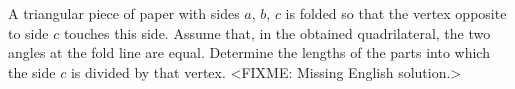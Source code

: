 \problem{}
A triangular piece of paper with sides $a$, $b$, $c$ is folded so that the
vertex opposite to side $c$ touches this side.
Assume that, in the obtained quadrilateral, the two angles at the fold line are
equal.
Determine the lengths of the parts into which the side $c$ is divided by that
vertex.
\solution
<FIXME: Missing English solution.>
\endproblem
